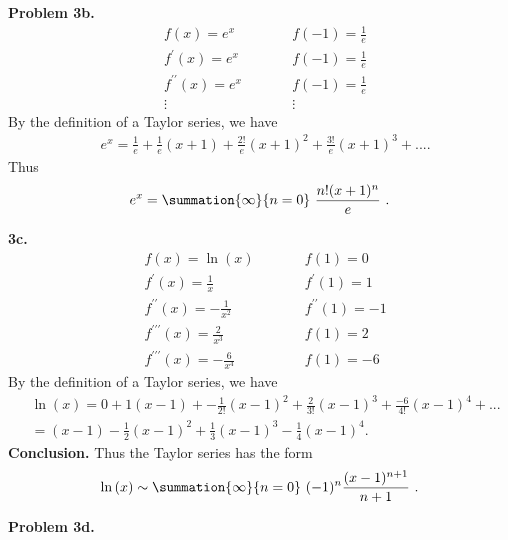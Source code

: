\documentclass{report}
\begin{document}
    \pagebreak \bigbreak \noindent 
    \textbf{Problem 3b.} 
    \begin{equation}
    \begin{alignedat}{2}
        &f(x) = e^{x} \quad \quad &&f(-1) = \frac{1}{e} \\
        &f^{\prime}(x) = e^{x} \quad \quad &&f(-1) = \frac{1}{e} \\
        &f^{\prime\prime}(x) = e^{x} \quad \quad &&f(-1) = \frac{1}{e}  \\
        &\vdots \quad \quad &&\vdots
    \end{alignedat}
    \end{equation}
    By the definition of a Taylor series, we have
    \begin{align*}
        &e^{x} = \frac{1}{e} + \frac{1}{e}(x+1) + \frac{2!}{e}(x+1)^{2}+\frac{3!}{e}(x+1)^{3} +...
    .\end{align*}
    \bigbreak \noindent 
    Thus 
    \begin{align*}
        e^{x} = \summation{\infty}{n=0}\ \frac{n!(x+1)^{n}}{e}\ 
    .\end{align*}

    \bigbreak \noindent 
    \textbf{3c.}
    \begin{equation}
    \begin{alignedat}{2}
        &f(x) =\ln{(x)}  \quad \quad &&f(1) = 0 \\
        &f^{\prime}(x) = \frac{1}{x} \quad \quad &&f^{\prime}(1) = 1 \\
        &f^{\prime\prime}(x) = -\frac{1}{x^{2}} \quad \quad &&f^{\prime\prime}(1) = -1 \\
        &f^{\prime\prime\prime}(x) = \frac{2}{x^{3}} \quad \quad &&f(1) = 2 \\
        &f^{\prime\prime\prime}(x) = -\frac{6}{x^{4}} \quad \quad &&f(1) = -6
    \end{alignedat}
    \end{equation}
    \bigbreak \noindent
    By the definition of a Taylor series, we have
    \begin{align*}
       &\ln{(x)} = 0 + 1(x-1) + -\frac{1}{2!}(x-1)^{2} + \frac{2}{3!}(x-1)^{3} + \frac{-6}{4!}(x-1)^{4} + ... \\
       &= (x-1)-\frac{1}{2}(x-1)^{2}+\frac{1}{3}(x-1)^{3}-\frac{1}{4}(x-1)^{4}
    .\end{align*}
    \textbf{Conclusion.} Thus the Taylor series has the form
    \begin{align*}
        \ln{(x)} \sim \summation{\infty}{n=0}\ (-1)^{n}\frac{(x-1)^{n+1}}{n+1}\ 
    .\end{align*}

    \bigbreak \noindent 
    \textbf{Problem 3d.}



    
    
\end{document}
